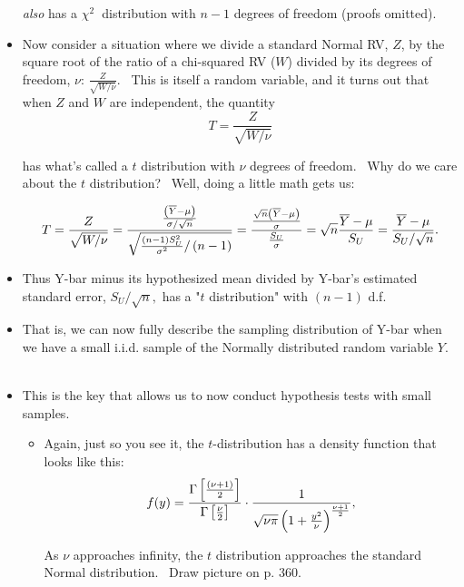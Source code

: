 \documentclass[11pt]{article}
\begin{document}
\begin{itemize}
\textit{also} has a $\chi ^{2}$\textbf{\ }distribution with $n-1$ degrees of
freedom (proofs omitted).

\item Now consider a situation where we divide a standard Normal RV, $Z$, by
the square root of the ratio of a chi-squared RV ($W$) divided by its
degrees of freedom, $\nu $: $\frac{Z}{\sqrt{W/\nu }}$. \ This is itself a
random variable, and it turns out that when $Z$ and $W$ are independent, the
quantity 
\begin{equation*}
T=\frac{Z}{\sqrt{W/\nu }}
\end{equation*}

has what's called a $t$ distribution with $\nu $ degrees of freedom. \ Why
do we care about the $t$ distribution? \ Well, doing a little math gets us:

\begin{equation*}
T=\frac{Z}{\sqrt{W/\nu }}=\frac{\frac{\left( \overline{Y}-\mu \right) }{%
\sigma /\sqrt{n}}}{\sqrt{\frac{\left( n-1\right) S_{U}^{2}}{\sigma ^{2}}%
/\left( n-1\right) }}=\frac{\frac{\sqrt{n}\left( \overline{Y}-\mu \right) }{%
\sigma }}{\frac{S_{U}}{\sigma }}=\sqrt{n}\frac{\overline{Y}-\mu }{S_{U}}=%
\frac{\overline{Y}-\mu }{S_{U}/\sqrt{n}}.
\end{equation*}

\item Thus Y-bar minus its hypothesized mean divided by Y-bar's estimated
standard error, $S_{U}/\sqrt{n},$ has a "$t$ distribution" with $\left(
n-1\right) $ d.f. \ 

\item That is, we can now fully describe the sampling distribution of Y-bar
when we have a small i.i.d. sample of the Normally distributed random
variable $Y$. \ 

\item This is the key that allows us to now conduct hypothesis tests with
small samples.

\begin{itemize}
\item Again, just so you see it, the $t$-distribution has a density function
that looks like this:%
\begin{equation*}
f(y)=\frac{\Gamma \left[ \frac{\left( \nu +1\right) }{2}\right] }{\Gamma %
\left[ \frac{\nu }{2}\right] }\cdot \frac{1}{\sqrt{\nu \pi }\left( 1+\frac{%
y^{2}}{\nu }\right) ^{\frac{\nu +1}{2}}},
\end{equation*}

As $\nu $ approaches infinity, the $t$ distribution approaches the standard
Normal distribution. \ Draw picture on p. 360.
\end{itemize}


\end{itemize}
\end{document}
